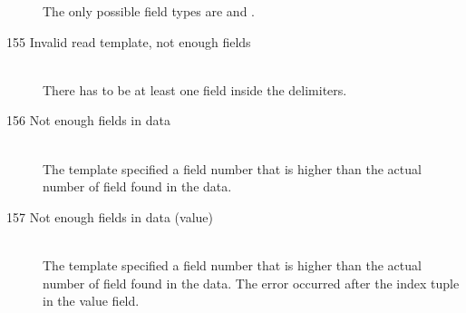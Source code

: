 \begin{description}
  The only possible field types are  and .
\item[155 Invalid read template, not enough fields]\ \\
  There has to be at least one field inside the delimiters.
\item[156 Not enough fields in data]\ \\
  The template specified a field number that is higher than the actual
  number of field found in the data. 
\item[157 Not enough fields in data (value)]\ \\
  The template specified a field number that is higher than the actual
  number of field found in the data. The error occurred after the 
  index tuple in the value field.


\end{description}
